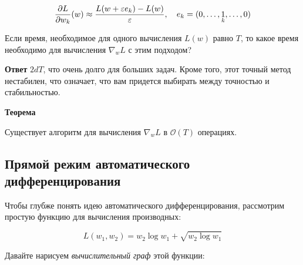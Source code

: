 \documentclass[
  russian,
  letterpaper,
  DIV=11,
  numbers=noendperiod]{scrartcl}
\begin{document}
\[
\dfrac{\partial L}{\partial w_k} (w) \approx \dfrac{L(w+\varepsilon e_k) - L(w)}{\varepsilon}, \quad e_k = (0, \ldots, \underset{{\tiny k}}{1}, \ldots, 0)
\]

\begin{tcolorbox}[enhanced jigsaw, colbacktitle=quarto-callout-color!10!white, toptitle=1mm, bottomrule=.15mm, left=2mm, opacitybacktitle=0.6, colframe=quarto-callout-color-frame, arc=.35mm, bottomtitle=1mm, colback=white, coltitle=black, title=\textcolor{quarto-callout-color}{\faInfo}\hspace{0.5em}{Question}, leftrule=.75mm, opacityback=0, rightrule=.15mm, toprule=.15mm, breakable, titlerule=0mm]

Если время, необходимое для одного вычисления \(L(w)\) равно \(T\), то
какое время необходимо для вычисления \(\nabla_w L\) с этим подходом?

\textbf{Ответ} \(2dT\), что очень долго для больших задач. Кроме того,
этот точный метод нестабилен, что означает, что вам придется выбирать
между точностью и стабильностью.

\textbf{Теорема}

Существует алгоритм для вычисления \(\nabla_w L\) в \(\mathcal{O}(T)\)
операциях. \footnotemark{}

\end{tcolorbox}


\subsection{Прямой режим автоматического
дифференцирования}\label{ux43fux440ux44fux43cux43eux439-ux440ux435ux436ux438ux43c-ux430ux432ux442ux43eux43cux430ux442ux438ux447ux435ux441ux43aux43eux433ux43e-ux434ux438ux444ux444ux435ux440ux435ux43dux446ux438ux440ux43eux432ux430ux43dux438ux44f}

Чтобы глубже понять идею автоматического дифференцирования, рассмотрим
простую функцию для вычисления производных:

\[
L(w_1, w_2) = w_2 \log w_1 + \sqrt{w_2 \log w_1}
\]

Давайте нарисуем \emph{вычислительный граф} этой функции:
\end{document}
